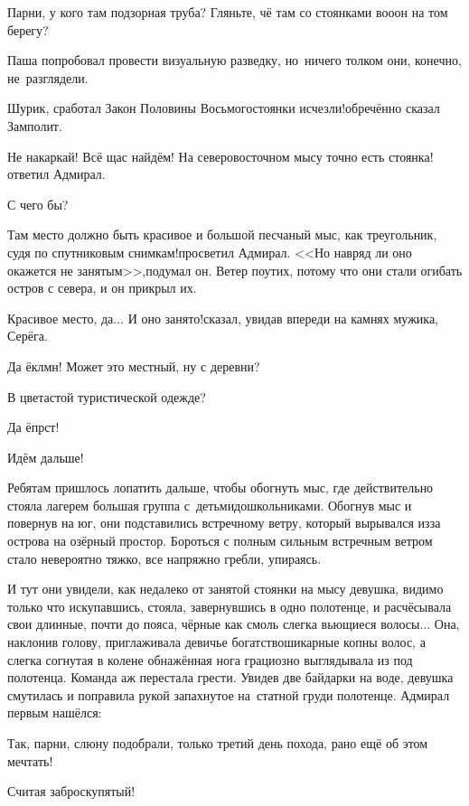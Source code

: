 \diagdash Парни, у кого там подзорная труба? Гляньте, чё там со стоянками во\sdash о\sdash он на том берегу?

Паша попробовал провести визуальную разведку, но~ничего толком они, конечно, не~разглядели.

\diagdash Шурик, сработал Закон Половины Восьмого\cite{Квадригин}\mdash стоянки исчезли!\mdash обречённо сказал Замполит.

\diagdash Не накаркай! Всё щас найдём! На северо\sdash восточном мысу точно есть стоянка!\mdash ответил Адмирал.

\diagdash С чего бы?

\diagdash Там место должно быть красивое и большой песчаный мыс, как треугольник, судя по спутниковым снимкам!\mdash просветил Адмирал. <<Но навряд ли оно окажется не занятым>>,\mdash подумал он. Ветер поутих, потому что они стали огибать остров с севера, и он прикрыл их.

\diagdash Красивое место, да$\ldots$ И оно занято!\mdash сказал, увидав впереди на камнях мужика, Серёга.

\diagdash Да ёклмн! Может это местный, ну с деревни?

\diagdash В цветастой туристической одежде?

\diagdash Да ёпрст!

\diagdash Идём дальше!

Ребятам пришлось лопатить дальше, чтобы обогнуть мыс, где действительно стояла лагерем большая группа с~детьми\sdash дошкольниками. Обогнув мыс и повернув на юг, они подставились встречному ветру, который вырывался из\sdash за острова на озёрный простор. Бороться с полным сильным встречным ветром стало невероятно тяжко, все напряжно гребли, упираясь.

И тут они увидели, как недалеко от занятой стоянки на мысу девушка, видимо только что искупавшись, стояла, завернувшись в одно полотенце, и расчёсывала свои длинные, почти до пояса, чёрные как смоль слегка вьющиеся волосы$\ldots$ Она, наклонив голову, приглаживала девичье богатство\mdash шикарные копны волос, а слегка согнутая в колене обнажённая нога грациозно выглядывала из под полотенца. Команда аж перестала грести. Увидев две байдарки на воде, девушка смутилась и поправила рукой запахнутое на~статной груди полотенце. Адмирал первым нашёлся:

\diagdash Так, парни, слюну подобрали, только третий день похода, рано ещё об этом мечтать!

\diagdash Считая заброску\mdash пятый!

